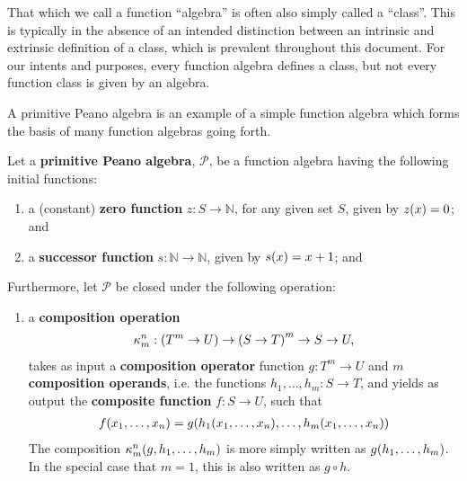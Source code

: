 \begin{remark} That which we call a function ``algebra'' is often also simply
called a ``class''. This is typically in the absence of an intended distinction
between an intrinsic and extrinsic definition of a class, which is prevalent
throughout this document. For our intents and purposes, every function algebra
defines a class, but not every function class is given by an algebra.
\end{remark} 

A primitive Peano algebra is an example of a simple function algebra which
forms the basis of many function algebras going forth.

\begin{definition} \label{def:function-algebra-p} Let a \textbf{primitive Peano
algebra}, $\mathcal{P}$, be a function algebra having the following initial
functions:

\begin{enumerate}[label=(\arabic*)]

\item a (constant) \textbf{zero function} $z : S \rightarrow \mathbb{N}$, for
any given set $S$, given by $z{\mathopen{}\left({x}\right)\mathclose{}} = 0$; and

\item a \textbf{successor function} $s : \mathbb{N} \rightarrow \mathbb{N}$, given by
$s{\mathopen{}\left({x}\right)\mathclose{}} = x + 1$; and

\end{enumerate}

Furthermore, let $\mathcal{P}$ be closed under the following operation:

\begin{enumerate}[label=(\arabic*),start=3]

\item a \textbf{composition operation}\begin{align*}
%
\kappa^n_m : \p{T^m \rightarrow U} \rightarrow \p{S \rightarrow T}^m
\rightarrow S \rightarrow U,
%
\end{align*}takes as input a \textbf{composition operator} function $g : T^m
\rightarrow U$ and $m$ \textbf{composition operands}, i.e. the functions $h_1,
\ldots, h_m : S \rightarrow T$, and yields as output the \textbf{composite
function} $f : S \rightarrow U$, such that\begin{align*}
%
f\p{x_1,\ldots,x_n} = g\p{h_1\p{x_1,\ldots,x_n}, \ldots, h_m\p{x_1,
\ldots,x_n}}
%
\end{align*} The composition $\kappa^n_m{\mathopen{}\left({g,h_1, \ldots, h_m}\right)\mathclose{}}$ is more simply
written as $g{\mathopen{}\left({h_1, \ldots, h_m}\right)\mathclose{}}$. In the special case that $m=1$, this is
also written as $g \circ h$.

\end{enumerate}

\end{definition}

